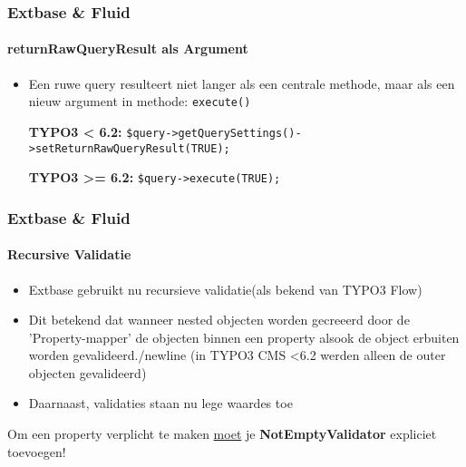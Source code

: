 
\begin{frame}[fragile]
	\frametitle{Extbase \& Fluid}
	\framesubtitle{returnRawQueryResult als Argument}

	\lstset{
		basicstyle=\smaller\ttfamily
	}

	\begin{itemize}
		\item Een ruwe query resulteert niet langer als een centrale methode,\newline
			maar als een nieuw argument in methode: \texttt{execute()}
			\newline

			\smaller\textbf{TYPO3 < 6.2:}\normalsize\newline
			\lstinline!$query->getQuerySettings()->setReturnRawQueryResult(TRUE);!
			\newline

			\smaller\textbf{TYPO3 >= 6.2:}\normalsize\newline
			\lstinline!$query->execute(TRUE);!

	\end{itemize}

\end{frame}


\begin{frame}[fragile]
	\frametitle{Extbase \& Fluid}
	\framesubtitle{Recursive Validatie}

	\begin{itemize}
		\item Extbase gebruikt nu recursieve validatie(als bekend van TYPO3 Flow)
		\item Dit betekend dat wanneer nested objecten worden gecreeerd door de 'Property-mapper' de objecten \newline
		binnen een property alsook de object erbuiten worden gevalideerd./newline 
		(in TYPO3 CMS <6.2 werden alleen de outer objecten gevalideerd)
		\item Daarnaast, validaties staan nu lege waardes toe
	\end{itemize}

	\breakingchange

	\smaller\begin{center} Om een property verplicht te maken \underline{moet} je \textbf{NotEmptyValidator} expliciet toevoegen!\end{center}\normalsize

\end{frame}

